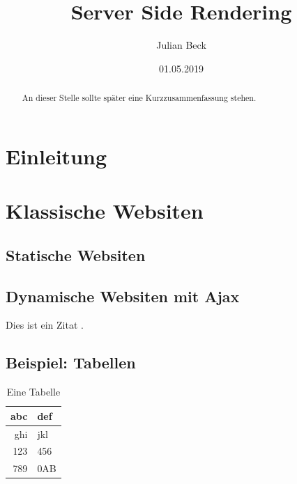 \documentclass[runningheads]{llncs}
\title{Server Side Rendering}
\author{Julian Beck}
\institute{Betreuer: Prof. Dr. rer. nat. Christian Zirpins}
\date{01.05.2019}
\begin{document}
\let\oldaddcontentsline\addcontentsline
\def\addcontentsline#1#2#3{}
\maketitle
\def\addcontentsline#1#2#3{\oldaddcontentsline{#1}{#2}{#3}}


\begin{abstract}
  An dieser Stelle sollte später eine Kurzzusammenfassung stehen.
\end{abstract}

\tableofcontents 
\newpage

\section{Einleitung}
\label{sec:Einleitung}



\section{Klassische Websiten}
\label{sec:Klassische Websiten}

\subsection{Statische Websiten}
\label{subsec:Statische Websiten}

\subsection{Dynamische Websiten mit Ajax}
\label{subsec:Dynamische Websiten mit Ajax}



Dies ist ein Zitat \cite{becker2008a}.

\subsection{Beispiel: Tabellen}
\label{subsec:Tables}


\begin{table}[h]
  \centering
  \caption{Eine Tabelle}
  \label{tab:atable}
  \begin{tabular}{|r|l|} \hline
    abc & def\\ \hline
    ghi & jkl\\ \hline
    123 & 456\\ \hline
    789 & 0AB\\ \hline
  \end{tabular}
\end{table}
\end{document}

